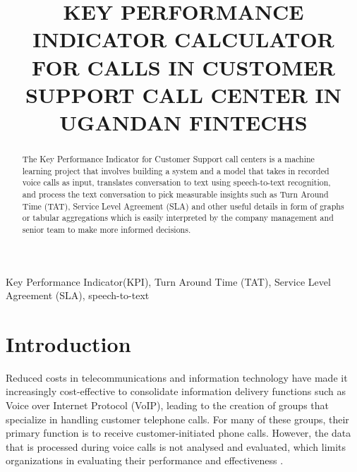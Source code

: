 \documentclass[conference]{IEEEtran}
\begin{document}
\title{KEY PERFORMANCE INDICATOR CALCULATOR FOR CALLS IN CUSTOMER SUPPORT CALL CENTER IN UGANDAN FINTECHS\\}

\author{
\and
{}
}

\maketitle

\begin{abstract}
The Key Performance Indicator for Customer Support call centers is a machine learning project that involves building a system and a model that takes in recorded voice calls as input, translates conversation to text using speech-to-text recognition, and process the text conversation to pick measurable insights such as Turn Around Time (TAT), Service Level Agreement (SLA) and other useful details in form of graphs or tabular aggregations which is easily interpreted by the company management and senior team to make more informed decisions.
\end{abstract}

\begin{IEEEkeywords}
Key Performance Indicator(KPI), Turn Around Time (TAT), Service Level Agreement (SLA), speech-to-text
\end{IEEEkeywords}

\section{Introduction}
Reduced costs in telecommunications and information technology have made it increasingly cost-effective to consolidate information delivery functions such as Voice over Internet Protocol (VoIP), leading to the creation of groups that specialize in handling customer telephone calls. For many of these groups, their primary function is to receive customer-initiated phone calls. However, the data that is processed during voice calls is not analysed and evaluated, which limits organizations in evaluating their performance and effectiveness \cite{b7}.
\end{document}
